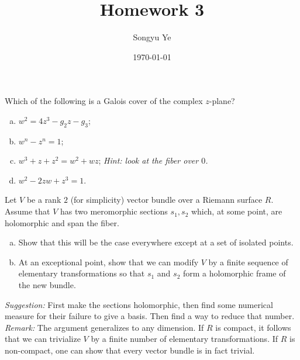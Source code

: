 \documentclass[12pt]{article}  %
\title{Homework 3}
\author{Songyu Ye}
\date{\today}
\begin{document}
\psettitle


\begin{problem}[1]
Which of the following is a Galois cover of the complex $z$-plane?
\begin{enumerate}[(a)]
    \item $w^2 = 4z^3 - g_2z - g_3$;
    \item $w^n - z^n = 1$;
    \item $w^3 + z + z^2 = w^2 + wz$; \textit{Hint: look at the fiber over $0$.}
    \item $w^2 - 2zw + z^3 = 1$.
\end{enumerate}
\end{problem}

\begin{solution}
\end{solution}

\begin{problem}[2]
Let $V$ be a rank $2$ (for simplicity) vector bundle over a Riemann surface $R$. Assume that $V$ has two meromorphic sections $s_1, s_2$ which, at some point, are holomorphic and span the fiber.
\begin{enumerate}[(a)]
    \item Show that this will be the case everywhere except at a set of isolated points.
    \item At an exceptional point, show that we can modify $V$ by a finite sequence of elementary transformations so that $s_1$ and $s_2$ form a holomorphic frame of the new bundle.
\end{enumerate}
\textit{Suggestion:} First make the sections holomorphic, then find some numerical measure for their failure to give a basis. Then find a way to reduce that number.\\
\textit{Remark:} The argument generalizes to any dimension. If $R$ is compact, it follows that we can trivialize $V$ by a finite number of elementary transformations. If $R$ is non-compact, one can show that every vector bundle is in fact trivial.
\end{problem}
\end{document}

